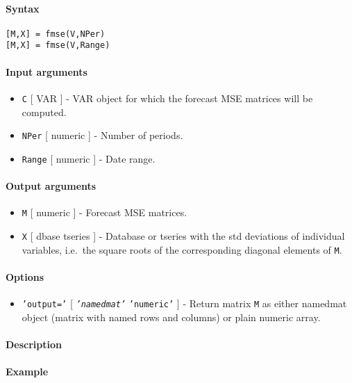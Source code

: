 


	\paragraph{Syntax}\label{syntax}

\begin{verbatim}
[M,X] = fmse(V,NPer)
[M,X] = fmse(V,Range)
\end{verbatim}

\paragraph{Input arguments}\label{input-arguments}

\begin{itemize}
\item
  \texttt{C} {[} VAR {]} - VAR object for which the forecast MSE
  matrices will be computed.
\item
  \texttt{NPer} {[} numeric {]} - Number of periods.
\item
  \texttt{Range} {[} numeric {]} - Date range.
\end{itemize}

\paragraph{Output arguments}\label{output-arguments}

\begin{itemize}
\item
  \texttt{M} {[} numeric {]} - Forecast MSE matrices.
\item
  \texttt{X} {[} dbase \textbar{} tseries {]} - Database or tseries with
  the std deviations of individual variables, i.e.~the square roots of
  the corresponding diagonal elements of \texttt{M}.
\end{itemize}

\paragraph{Options}\label{options}

\begin{itemize}
\itemsep1pt\parskip0pt
\item
  \texttt{'output='} {[} \emph{\texttt{'namedmat'}} \textbar{}
  \texttt{'numeric'} {]} - Return matrix \texttt{M} as either namedmat
  object (matrix with named rows and columns) or plain numeric array.
\end{itemize}

\paragraph{Description}\label{description}

\paragraph{Example}\label{example}


